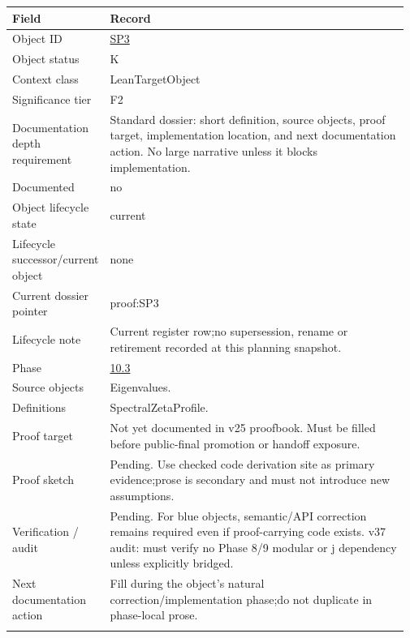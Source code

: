 \begin{longtable}{L{0.16\linewidth} L{0.81\linewidth}}
\hline
\textbf{Field} & \textbf{Record}\\
\hline
Object ID & \hyperlink{object-row-SP3}{SP3}\\
\hline\addlinespace[0.20em]
Object status & K\\
\hline\addlinespace[0.20em]
Context class & LeanTargetObject\\
\hline\addlinespace[0.20em]
Significance tier & F2\\
\hline\addlinespace[0.20em]
Documentation depth requirement & Standard dossier: short definition, source objects, proof target, implementation location, and next documentation action. No large narrative unless it blocks implementation.\\
\hline\addlinespace[0.20em]
Documented & no\\
\hline\addlinespace[0.20em]
Object lifecycle state & current\\
\hline\addlinespace[0.20em]
Lifecycle successor/\allowbreak{}current object & none\\
\hline\addlinespace[0.20em]
Current dossier pointer & proof:SP3\\
\hline\addlinespace[0.20em]
Lifecycle note & Current register row;\newline no supersession, rename or retirement recorded at this planning snapshot.\\
\hline\addlinespace[0.20em]
Phase & \hyperlink{phase-row-10-3}{10.3}\\
\hline\addlinespace[0.20em]
Source objects & Eigenvalues.\\
\hline\addlinespace[0.20em]
Definitions & SpectralZetaProfile.\\
\hline\addlinespace[0.20em]
Proof target & Not yet documented in v25 proofbook. Must be filled before public-final promotion or handoff exposure.\\
\hline\addlinespace[0.20em]
Proof sketch & Pending. Use checked code derivation site as primary evidence;\newline prose is secondary and must not introduce new assumptions.\\
\hline\addlinespace[0.20em]
Verification /\allowbreak{} audit & Pending. For blue objects, semantic/\allowbreak{}API correction remains required even if proof-carrying code exists. v37 audit: must verify no Phase 8/\allowbreak{}9 modular or j dependency unless explicitly bridged.\\
\hline\addlinespace[0.20em]
Next documentation action & Fill during the object's natural correction/\allowbreak{}implementation phase;\newline do not duplicate in phase-local prose.\\
\hline\addlinespace[0.20em]
\end{longtable}
